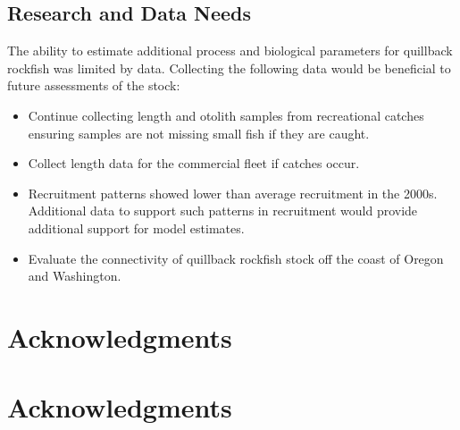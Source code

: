 \documentclass[11pt,
  english,
  a4paper,
]{article}
\begin{document}
\leavevmode\tagmcend\tagstructend\par


\hypertarget{research-and-data-needs-1}{%
\subsection{Research and Data Needs}\label{research-and-data-needs-1}}

\leavevmode\tagmcend\tagstructend


The ability to estimate additional process and biological parameters for quillback rockfish was limited by data. Collecting the following data would be beneficial to future assessments of the stock:

\leavevmode\tagmcend\tagstructend\par

\begin{itemize}

    \item Continue collecting length and otolith samples from recreational catches ensuring samples are not missing small fish if they are caught.

    \item Collect length data for the commercial fleet if catches occur.
    
    \item Recruitment patterns showed lower than average recruitment in the 2000s. Additional data to support such patterns in recruitment would provide additional support for model estimates.  

    \item Evaluate the connectivity of quillback rockfish stock off the coast of Oregon and Washington. 

\end{itemize}


\hypertarget{acknowledgments}{%
\section{Acknowledgments}\label{acknowledgments}}

\leavevmode\tagmcend\tagstructend


\hypertarget{acknowledgments-1}{%
\section{Acknowledgments}\label{acknowledgments-1}}
\end{document}
